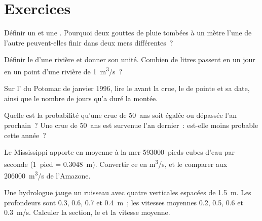 \section{Exercices}

\begin{exercise}[$\star$]\label{exo:g10:drainage-basins:1}
Définir un  et une . Pourquoi deux
gouttes de pluie tombées à un mètre l'une de l'autre peuvent-elles finir
dans deux mers différentes~?
\end{exercise}

\begin{exercise}[$\star$]\label{exo:g10:drainage-basins:2}
Définir le  d'une rivière et donner son unité. Combien de litres
passent en un jour en un point d'une rivière de  \qty{1}{m^3/s}~?
\end{exercise}

\begin{exercise}[$\star$]\label{exo:g10:drainage-basins:3}
Sur l' du Potomac de janvier 1996, lire le  avant la
crue, le  de pointe et sa date, ainsi que le nombre de jours qu'a duré
la montée.
\end{exercise}

\begin{exercise}[$\star$]\label{exo:g10:drainage-basins:4}
Quelle est la probabilité qu'une crue de \num{50}~ans soit égalée ou
dépassée l'an prochain~? Une crue de \num{50}~ans est survenue l'an
dernier~: est-elle moins probable cette année~?
\end{exercise}

\begin{exercise}[$\star$]\label{exo:g10:drainage-basins:5}
Le Mississippi apporte en moyenne à la mer \num{593000}~pieds cubes d'eau
par seconde (\num{1}~pied = \qty{0.3048}{m}). Convertir ce  en
\unit{m^3/s}, et le comparer aux \qty{206000}{m^3/s} de l'Amazone.
\end{exercise}

\begin{exercise}[$\star\star$]\label{exo:g10:drainage-basins:6}
Une hydrologue jauge un ruisseau avec quatre verticales espacées de
\qty{1.5}{m}. Les profondeurs sont \num{0.3}, \num{0.6}, \num{0.7} et
\qty{0.4}{m}~; les vitesses moyennes \num{0.2}, \num{0.5}, \num{0.6} et
\qty{0.3}{m/s}. Calculer la section, le  et la vitesse moyenne.
\end{exercise}

